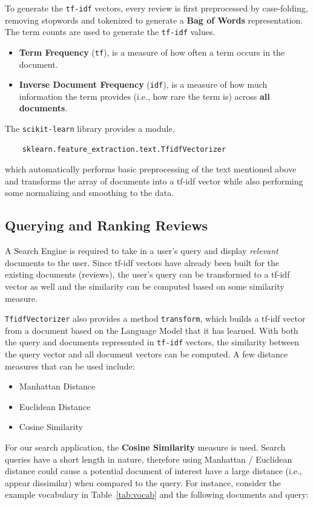\documentclass[sigconf,nonacm=true]{acmart}
\begin{document}
To generate the \verb|tf-idf| vectors, every review is first preprocessed by 
case-folding, removing stopwords and tokenized to generate a 
\textbf{Bag of Words} representation. The term counts are used to generate the
\verb|tf-idf| values.
\begin{itemize}
	\item \textbf{Term Frequency} (\verb|tf|), is a measure of how often a term occurs
	in the document.
	\item \textbf{Inverse Document Frequency} (\verb|idf|), is a measure of how much
	information the term provides (i.e., how rare the term is) across
	\textbf{all documents}.
\end{itemize}
The \verb|scikit-learn| library provides a module,
\begin{verbatim}
	sklearn.feature_extraction.text.TfidfVectorizer
\end{verbatim}
which automatically performs basic preprocessing of the text mentioned above and
transforms the array of documents into a tf-idf vector while also performing some
normalizing and smoothing to the data.


\subsection{Querying and Ranking Reviews}
A Search Engine is required to take in a user's query and display \textit{relevant} 
documents to the user. Since tf-idf vectors have already been built for the 
existing documents (reviews), the user's query can be transformed to a tf-idf vector
as well and the similarity can be computed based on some similarity measure.

\verb|TfidfVectorizer| also provides a method \verb|transform|, which builds a tf-idf
vector from a document based on the Language Model that it has learned. With both the
query and documents represented in \verb|tf-idf| vectors, the similarity between the
query vector and all document vectors can be computed. A few distance measures that
can be used include:

\begin{itemize}
	\item Manhattan Distance
	\item Euclidean Distance
	\item Cosine Similarity
\end{itemize}

For our search application, the \textbf{Cosine Similarity} measure is used.
Search queries have a short length in nature, therefore using Manhattan / 
Euclidean distance could cause a potential document of interest have a large
distance (i.e., appear dissimilar) when compared to the query. For instance,
consider the example vocabulary in Table~\ref{tab:vocab} and the following
documents and query:
\end{document}

